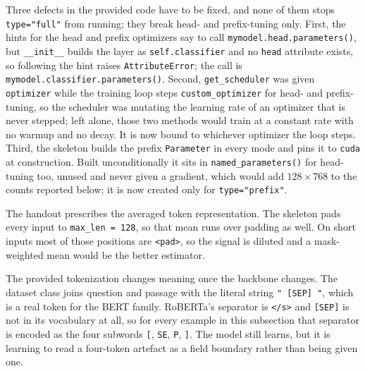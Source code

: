 \documentclass[11pt]{article}
\begin{document}
{\sloppy
Three defects in the provided code have to be fixed, and none of them stops \texttt{type="full"}
from running; they break head- and prefix-tuning only. First, the hints for the head and prefix
optimizers say to call \texttt{mymodel.head.parameters()}, but \texttt{\_\_init\_\_} builds the
layer as \texttt{self.classifier} and no \texttt{head} attribute exists, so following the hint
raises \texttt{AttributeError}; the call is \texttt{mymodel.classifier.parameters()}. Second,
\texttt{get\_scheduler} was given \texttt{optimizer} while the training loop steps
\texttt{custom\_optimizer} for head- and prefix-tuning, so the scheduler was mutating the learning
rate of an optimizer that is never stepped; left alone, those two methods would train at a
constant rate with no warmup and no decay. It is now bound to whichever optimizer the loop steps.
Third, the skeleton builds the prefix \texttt{Parameter} in every mode and pins it to
\texttt{cuda} at construction. Built unconditionally it sits in \texttt{named\_parameters()} for
head-tuning too, unused and never given a gradient, which would add $128 \times 768$ to the counts
reported below; it is now created only for \texttt{type="prefix"}.
\par}

The handout prescribes the averaged token representation. The skeleton pads every input to
\texttt{max\_len = 128}, so that mean runs over padding as well. On short inputs most of
those positions are \texttt{<pad>}, so the signal is diluted and a mask-weighted mean would be the
better estimator.

The provided tokenization changes meaning once the backbone changes. The dataset class joins question and passage with the literal string \texttt{" [SEP] "}, which is a
real token for the BERT family. RoBERTa's separator is \texttt{</s>} and \texttt{[SEP]} is not in
its vocabulary at all, so for every example in this subsection that separator is encoded as the
four subwords \texttt{[}, \texttt{SE}, \texttt{P}, \texttt{]}. The model still learns, but it is
learning to read a four-token artefact as a field boundary rather than being given one.
\end{document}
